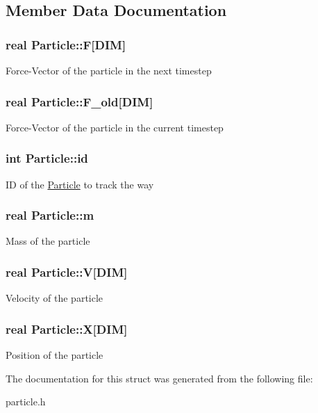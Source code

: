 \subsection{Member Data Documentation}
\hypertarget{struct_particle_a3103793ac96498582ca8b0502c0e93d3}{
\subsubsection[{F}]{\setlength{\rightskip}{0pt plus 5cm}real Particle\-::\-F\mbox{[}D\-I\-M\mbox{]}}}\label{struct_particle_a3103793ac96498582ca8b0502c0e93d3}
Force-\/\-Vector of the particle in the next timestep \hypertarget{struct_particle_a04a7aa77cb3cd92d826c0e8f03423955}{
\subsubsection[{F\-\_\-old}]{\setlength{\rightskip}{0pt plus 5cm}real Particle\-::\-F\-\_\-old\mbox{[}D\-I\-M\mbox{]}}}\label{struct_particle_a04a7aa77cb3cd92d826c0e8f03423955}
Force-\/\-Vector of the particle in the current timestep \hypertarget{struct_particle_a544b202775517f8ba05efcb9e0a21bee}{
\subsubsection[{id}]{\setlength{\rightskip}{0pt plus 5cm}int Particle\-::id}}\label{struct_particle_a544b202775517f8ba05efcb9e0a21bee}
I\-D of the \hyperlink{struct_particle}{Particle} to track the way \hypertarget{struct_particle_aa48f69912ffbf8516689a5710586e3a9}{
\subsubsection[{m}]{\setlength{\rightskip}{0pt plus 5cm}real Particle\-::m}}\label{struct_particle_aa48f69912ffbf8516689a5710586e3a9}
Mass of the particle \hypertarget{struct_particle_a69ff0f97b590846150012c31f04b88c8}{
\subsubsection[{V}]{\setlength{\rightskip}{0pt plus 5cm}real Particle\-::\-V\mbox{[}D\-I\-M\mbox{]}}}\label{struct_particle_a69ff0f97b590846150012c31f04b88c8}
Velocity of the particle \hypertarget{struct_particle_aac2fa2def51939805df39321397aa60e}{
\subsubsection[{X}]{\setlength{\rightskip}{0pt plus 5cm}real Particle\-::\-X\mbox{[}D\-I\-M\mbox{]}}}\label{struct_particle_aac2fa2def51939805df39321397aa60e}
Position of the particle 

The documentation for this struct was generated from the following file\-:\begin{DoxyCompactItemize}
\item 
particle.\-h\end{DoxyCompactItemize}
